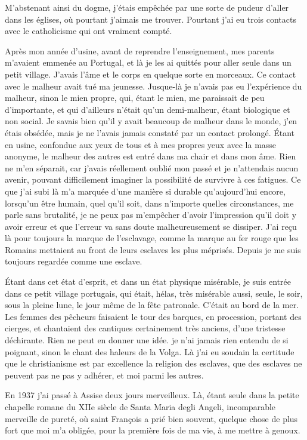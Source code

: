 \documentclass[french,twoside]{book} %
\begin{document}
M'abstenant ainsi du dogme, j'étais empêchée par une sorte de pudeur d'aller dans les églises, où pourtant j'aimais me trouver. Pourtant j'ai eu trois contacts avec le catholicisme qui ont vraiment compté.\par
Après mon année d'usine, avant de reprendre l'enseignement, mes parents m'avaient emmenée au Portugal, et là je les ai quittés pour aller seule dans un petit village. J'avais l'âme et le corps en quelque sorte en morceaux. Ce contact avec le malheur avait tué ma jeunesse. Jusque-là je n'avais pas eu l'expérience du malheur, sinon le mien propre, qui, étant le mien, me paraissait de peu d'importante, et qui d'ailleurs n'était qu'un demi-malheur, étant biologique et non social. Je savais bien qu'il y avait beaucoup de malheur dans le monde, j'en étais obsédée, mais je ne l'avais jamais constaté par un contact prolongé. Étant en usine, confondue aux yeux de tous et à mes propres yeux avec la masse anonyme, le malheur des autres est entré dans ma chair et dans mon âme. Rien ne m'en séparait, car j'avais réellement oublié mon passé et je n'attendais aucun avenir, pouvant difficilement imaginer la possibilité de survivre à ces fatigues. Ce que j'ai subi là m'a marquée d'une manière si durable qu'aujourd'hui encore, lorsqu'un être humain, quel qu'il soit, dans n'importe quelles circonstances, me parle sans brutalité, je ne peux pas m'empêcher d'avoir l'impression qu'il doit y avoir erreur et que l'erreur va sans doute malheureusement se dissiper. J'ai reçu là pour toujours la marque de l'esclavage, comme la marque au fer rouge que les Romains mettaient au front de leurs esclaves les plus méprisés. Depuis je me suis toujours regardée comme une esclave.\par
Étant dans cet état d'esprit, et dans un état physique misérable, je suis entrée dans ce petit village portugais, qui était, hélas, très misérable aussi, seule, le soir, sous la pleine lune, le jour même de la fête patronale. C'était au bord de la mer. Les femmes des pêcheurs faisaient le tour des barques, en procession, portant des cierges, et chantaient des cantiques certainement très anciens, d'une tristesse déchirante. Rien ne peut en donner une idée. je n'ai jamais rien entendu de si poignant, sinon le chant des haleurs de la Volga. Là j'ai eu soudain la certitude que le christianisme est par excellence la religion des esclaves, que des esclaves ne peuvent pas ne pas y adhérer, et moi parmi les autres.\par
En 1937 j'ai passé à Assise deux jours merveilleux. Là, étant seule dans la petite chapelle romane du XIIe siècle de Santa Maria degli Angeli, incomparable merveille de pureté, où saint François a prié bien souvent, quelque chose de plus fort que moi m'a obligée, pour la première fois de ma vie, à me mettre à genoux.\par
\end{document}
